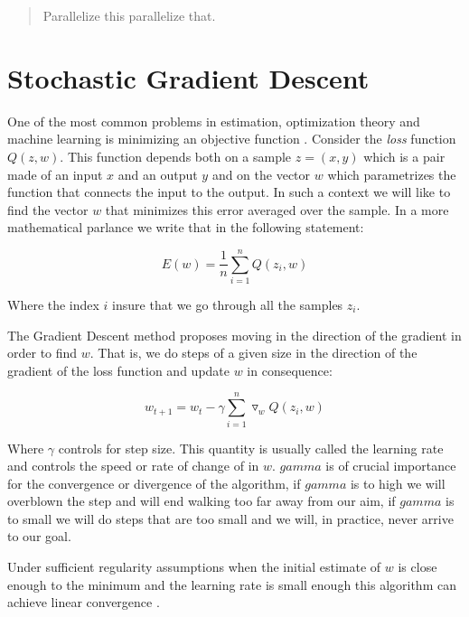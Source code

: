 \documentclass[11pt,a4paper]{article}
\begin{document}
\begin{abstract}
Parallelize this parallelize that.

\end{abstract}

\section{Stochastic Gradient Descent}

One of the most common problems in estimation, optimization theory and machine learning is
minimizing an objective function \citep{bottou2010large}. Consider the \textit{loss} function $Q(z,
w)$. This function depends both on a sample $z=(x, y)$ which is a pair made of an input $x$ and an
output $y$ and on the vector $w$ which parametrizes the function that connects the input to the
output. In such a context we will like to find the vector $w$ that minimizes this error averaged
over the sample. In a more mathematical parlance we write that in the following statement:

\begin{equation}
E(w) = \frac{1}{n} \sum_{i=1}^n Q(z_i, w)
\end{equation}

Where the index $i$ insure that we go through all the samples $z_i$.

The Gradient Descent method proposes moving in the direction of the gradient in order to find $w$. That is, we do steps of a given size in the direction of the gradient of the loss function and update $w$ in consequence:

\begin{equation}
w_{t + 1} = w_t - \gamma \sum_{i=1}^n \triangledown_w Q(z_i, w)
\end{equation}

Where $\gamma$ controls for step size. This quantity is usually called the learning rate and
controls the speed or rate of change of in $w$. $gamma$ is of crucial importance for the
convergence or divergence of the algorithm, if $gamma$ is to high we will overblown the step and
will end walking too far away from our aim, if $gamma$ is to small we will do steps that are too
small and we will, in practice, never arrive to our goal.

Under sufficient regularity assumptions when the initial estimate of $w$ is close enough to the
minimum and the learning rate is small enough this algorithm can achieve linear convergence
\citep{dennis1996numerical}.
\end{document}
